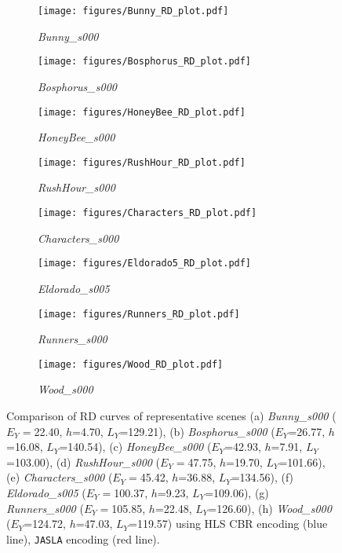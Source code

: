 \documentclass{article}
\newcommand{\jaslad}{\texttt{JASLA}\xspace}
\begin{document}
\begin{figure*}[!t]
\centering
\begin{subfigure}{0.229\textwidth}
    \centering
   \texttt{[image: figures/Bunny\_RD\_plot.pdf]}
    \caption{\textit{Bunny\_s000}}
\end{subfigure}
\hfill
\begin{subfigure}{0.229\textwidth}
    \centering
   \texttt{[image: figures/Bosphorus\_RD\_plot.pdf]}
    \caption{\textit{Bosphorus\_s000}}
    \label{fig:bosphorus_rd1}
\end{subfigure}
\hfill
\begin{subfigure}{0.229\textwidth}
    \centering
   \texttt{[image: figures/HoneyBee\_RD\_plot.pdf]}
    \caption{\textit{HoneyBee\_s000}}
    \label{fig:honeybee_rd1}
\end{subfigure}
\hfill
\begin{subfigure}{0.229\textwidth}
    \centering
   \texttt{[image: figures/RushHour\_RD\_plot.pdf]}
    \caption{\textit{RushHour\_s000}}
    \label{fig:rushhour_rd1}
\end{subfigure}
\vfill
\begin{subfigure}{0.229\textwidth}
    \centering
   \texttt{[image: figures/Characters\_RD\_plot.pdf]}
    \caption{\textit{Characters\_s000}}
\end{subfigure}
\hfill
\begin{subfigure}{0.229\textwidth}
    \centering
   \texttt{[image: figures/Eldorado5\_RD\_plot.pdf]}
    \caption{\textit{Eldorado\_s005}}
\end{subfigure}
\hfill
\begin{subfigure}{0.229\textwidth}
    \centering
   \texttt{[image: figures/Runners\_RD\_plot.pdf]}
    \caption{\textit{Runners\_s000}}
    \label{fig:runners_rd1}
\end{subfigure}
\hfill
\begin{subfigure}{0.229\textwidth}
    \centering
   \texttt{[image: figures/Wood\_RD\_plot.pdf]}
    \caption{\textit{Wood\_s000}}
    \label{fig:wood_rd1}
\end{subfigure}
\vspace{-0.3em}
\caption{Comparison of RD curves of representative scenes (a) \textit{Bunny\_s000} ($E_{Y}=$22.40, $h$=4.70, $L_{Y}$=129.21), (b) \textit{Bosphorus\_s000} ($E_{Y}$=26.77, $h$=16.08, $L_{Y}$=140.54), (c) \textit{HoneyBee\_s000} ($E_{Y}$=42.93, $h$=7.91, $L_{Y}$=103.00), (d) \textit{RushHour\_s000} ($E_{Y}=$47.75, $h$=19.70, $L_{Y}$=101.66), (e) \textit{Characters\_s000} ($E_{Y}=$45.42, $h$=36.88, $L_{Y}$=134.56), (f) \textit{Eldorado\_s005} ($E_{Y}=$100.37, $h$=9.23, $L_{Y}$=109.06), (g) \textit{Runners\_s000} ($E_{Y}=$105.85, $h$=22.48, $L_{Y}$=126.60), (h) \textit{Wood\_s000} ($E_{Y}$=124.72, $h$=47.03, $L_{Y}$=119.57) using HLS CBR encoding (blue line), \jaslad encoding (red line).}
\vspace{-0.80em}
\label{fig:rd_res_jasla}
\end{figure*}
\end{document}
